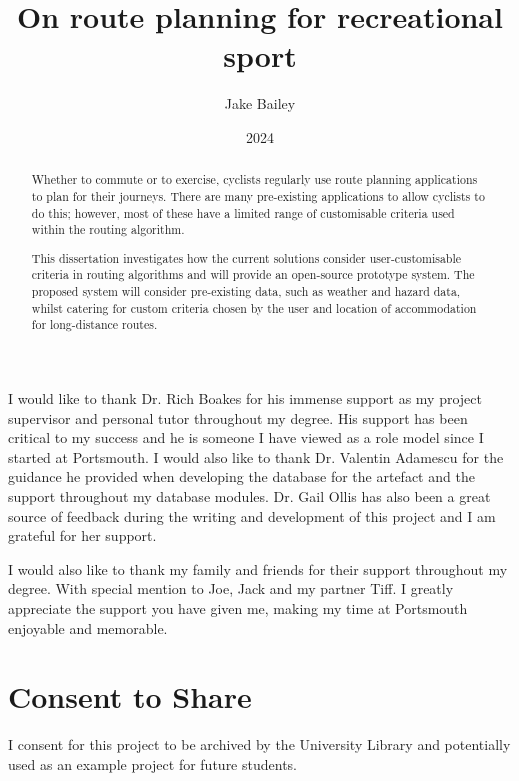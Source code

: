 \documentclass[bsc]{abdnthesis}
\title{On route planning for recreational sport}
\author{Jake Bailey}
\date{2024}
\begin{document}

\maketitle
\makedeclaration


\begin{abstract}
    Whether to commute or to exercise, cyclists regularly use route planning applications to plan for their journeys. There are many pre-existing applications to allow cyclists to do this; however, most of these have a limited range of customisable criteria used within the routing algorithm.

    This dissertation investigates how the current solutions consider user-customisable criteria in routing algorithms and will provide an open-source prototype system. The proposed system will consider pre-existing data, such as weather and hazard data, whilst catering for custom criteria chosen by the user and location of accommodation for long-distance routes.
\end{abstract}

\begin{acknowledgements}
  I would like to thank Dr. Rich Boakes for his immense support as my project supervisor and personal tutor throughout my degree. His support has been critical to my success and he is someone I have viewed as a role model since I started at Portsmouth. I would also like to thank Dr. Valentin Adamescu for the guidance he provided when developing the database for the artefact and the support throughout my database modules. Dr. Gail Ollis has also been a great source of feedback during the writing and development of this project and I am grateful for her support.

  I would also like to thank my family and friends for their support throughout my degree. With special mention to Joe, Jack and my partner Tiff. I greatly appreciate the support you have given me, making my time at Portsmouth enjoyable and memorable.
\end{acknowledgements}

\section*{Consent to Share}
I consent for this project to be archived by the University Library and potentially used as an example project for future students.
\end{document}
